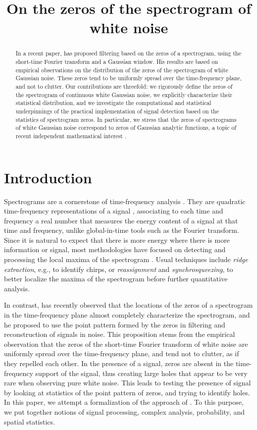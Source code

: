 \documentclass[a4paper,11pt]{article}
\title{On the zeros of the spectrogram of
  white noise}
\date{}
\theoremstyle{plain}
\theoremstyle{remark}
\begin{document}
\maketitle
\begin{abstract}
In a recent paper, \cite{Fla15} has proposed filtering based on the zeros of a
spectrogram, using the short-time Fourier transform and a Gaussian window. His
results are based on empirical observations on the distribution of the zeros of
the spectrogram of white Gaussian noise. These zeros tend to be uniformly spread over the
time-frequency plane, and not to clutter. Our contributions are threefold:
we rigorously define the zeros of the spectrogram of continuous white Gaussian noise, we
explicitly characterize their statistical distribution, and we investigate the
computational and statistical underpinnings of the practical implementation of
signal detection based on the statistics of spectrogram zeros. In
particular, we stress that the zeros of spectrograms of white Gaussian noise
correspond to zeros of Gaussian analytic functions, a topic of recent
independent mathematical interest \citep{HKPV09}.
\end{abstract}

\section{Introduction}
\label{s:intro}
Spectrograms are a cornerstone of time-frequency analysis \citep{Fla98}. They are quadratic time-frequency representations of a
signal \cite[Chapter 4]{Gro01}, associating to each time and frequency a real
number that measures the energy content of a signal at that time and frequency, unlike global-in-time tools such as the Fourier
transform. Since it is natural to expect that there is more energy where there
is more information or signal, most methodologies have focused on detecting and
processing the local maxima of the spectrogram \citep{Coh95, Fla98, Gro01}. Usual techniques include \emph{ridge extraction},
e.g., to identify chirps, or \emph{reassignment} and \emph{synchrosqueezing}, to
better localize the maxima of the spectrogram before further quantitative
analysis. 

In contrast, \cite{Fla15} has recently observed that the locations of the zeros of a
spectrogram in the time-frequency plane almost completely characterize the
spectrogram, and he proposed to use the point pattern formed by the zeros in
filtering and reconstruction of signals in noise. This proposition stems from
the empirical observation that the zeros of the short-time Fourier transform of
white noise are uniformly spread over the time-frequency plane, and tend not to
clutter, as if they repelled each other. In the presence of a signal, zeros are
absent in the time-frequency support of the signal, thus creating large holes
that appear to be very rare when observing pure white noise. This leads to testing
the presence of signal by looking at statistics of the point pattern of zeros,
and trying to identify holes. In this paper, we attempt a formalization of the
approach of \cite{Fla15}. To this purpose, we put together notions of signal
processing, complex analysis, probability, and spatial statistics.
\end{document}
